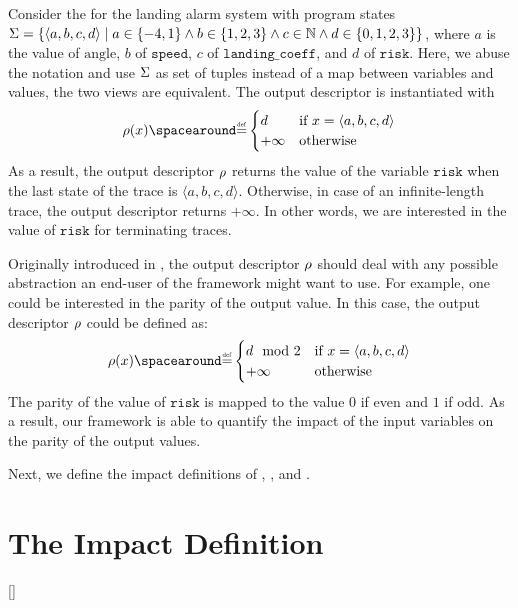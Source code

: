 \begin{example}
  Consider the  for the landing alarm system with program states $\Sigma=\{\langle a, b, c, d \rangle \mid a\in\{-4,1\}\land b\in\{1,2,3\}\land c\in\mathbb{N} \land d\in\{0,1,2,3\}\}$, where $a$ is the value of $\text{angle}$, $b$ of $\texttt{speed}$, $c$ of $\texttt{landing\_coeff}$, and $d$ of $\texttt{risk}$.
  Here, we abuse the notation and use $\Sigma$ as set of tuples instead of a map between variables and values, the two views are equivalent.
  The output descriptor is instantiated with
  \[
  \outputobs(x) \DefeQ \begin{cases}
    d & \text{if } x = \langle a, b, c, d \rangle \\
    +\infty & \text{otherwise}
  \end{cases}
  \]
  As a result, the output descriptor $\rho$ returns the value of the variable $\texttt{risk}$ when the last state of the trace is $\langle a, b, c, d \rangle$. Otherwise, in case of an infinite-length trace, the output descriptor returns $+\infty$.
  In other words, we are interested in the value of $\texttt{risk}$ for terminating traces.
\end{example}

\begin{example}
  Originally introduced in , the output descriptor $\rho$ should deal with any possible abstraction an end-user of the framework might want to use.
  For example, one could be interested in the parity of the output value.
  In this case, the output descriptor $\rho$ could be defined as:
  \[
  \outputobs(x) \DefeQ \begin{cases}
    d \mod 2 & \text{if } x = \langle a, b, c, d \rangle \\
    +\infty & \text{otherwise}
  \end{cases}
  \]
  The parity of the value of $\texttt{risk}$ is mapped to the value $0$ if even and $1$ if odd.
  As a result, our framework is able to quantify the impact of the input variables on the parity of the output values.
\end{example}

Next, we define the impact definitions of \outcomesname{}, \rangename{}, and \qusedname{}.

\section{The \outcomesname{} Impact Definition}[\outcomesname]

